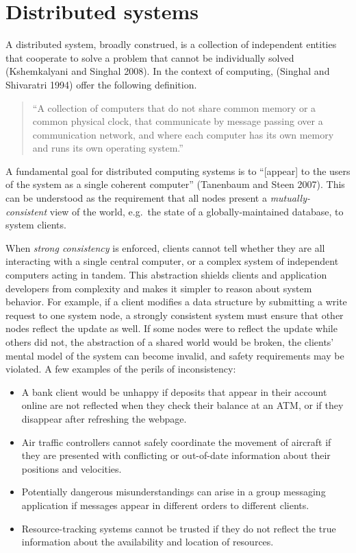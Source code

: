 \documentclass[]             %
{NASA}                       %
\theoremstyle{definition}
\begin{document}
\hypertarget{distributed-systems-1}{%
\section{Distributed systems}\label{distributed-systems-1}}

\label{sec:background}

A distributed system, broadly construed, is a collection of independent
entities that cooperate to solve a problem that cannot be individually
solved (Kshemkalyani and Singhal 2008). In the context of computing,
(Singhal and Shivaratri 1994) offer the following definition.

\begin{quote}
``A collection of computers that do not share common memory or a common
physical clock, that communicate by message passing over a communication
network, and where each computer has its own memory and runs its own
operating system.''
\end{quote}

A fundamental goal for distributed computing systems is to
``{[}appear{]} to the users of the system as a single coherent
computer'' (Tanenbaum and Steen 2007). This can be understood as the
requirement that all nodes present a \emph{mutually-consistent} view of
the world, e.g.~the state of a globally-maintained database, to system
clients.

When \emph{strong consistency} is enforced, clients cannot tell whether
they are all interacting with a single central computer, or a complex
system of independent computers acting in tandem. This abstraction
shields clients and application developers from complexity and makes it
simpler to reason about system behavior. For example, if a client
modifies a data structure by submitting a write request to one system
node, a strongly consistent system must ensure that other nodes reflect
the update as well. If some nodes were to reflect the update while
others did not, the abstraction of a shared world would be broken, the
clients' mental model of the system can become invalid, and safety
requirements may be violated. A few examples of the perils of
inconsistency:

\begin{itemize}
\item
  A bank client would be unhappy if deposits that appear in their
  account online are not reflected when they check their balance at an
  ATM, or if they disappear after refreshing the webpage.
\item
  Air traffic controllers cannot safely coordinate the movement of
  aircraft if they are presented with conflicting or out-of-date
  information about their positions and velocities.
\item
  Potentially dangerous misunderstandings can arise in a group messaging
  application if messages appear in different orders to different
  clients.
\item
  Resource-tracking systems cannot be trusted if they do not reflect the
  true information about the availability and location of resources.
\end{itemize}
\end{document}
